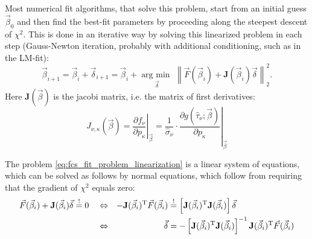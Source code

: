 \documentclass[a4paper,notitlepage]{article}
\DeclareMathOperator*{\argmin}{arg\:min\ }
\newcommand{\mat}[1]{\mathrm{\mathbf{#1}}}
\begin{document}
Most numerical fit algorithms, that solve this problem, start from an initial guess $\vec{\beta}_0$ and then find the best-fit parameters by proceeding along the steepest descent of $\chi^2$. This is done in an iterative way by solving this linearized problem in each step (Gauss-Newton iteration, probably with additional conditioning, such as in the LM-fit):
\begin{equation}\label{eq:fcs_fit_problem_linearization}
  \vec{\beta}_{i+1}=\vec{\beta}_{i}+\vec{\delta}_{i+1}=\vec{\beta}_{i}+\argmin\limits_{\vec{\delta}}\left\|\vec{F}(\vec{\beta}_i)+\mat{J}(\vec{\beta}_i)\vec{\delta}\right\|_2^2.
\end{equation}
Here $\mat{J}(\vec{\beta})$ is the jacobi matrix, i.e. the matrix of first derivatives:
\begin{equation}\label{eq:fit_jacobi}
    J_{\nu,\kappa}(\vec{\beta})=\left.\frac{\partial f_\nu}{\partial p_\kappa}\right|_{\vec{\beta}}=\frac{1}{\hat{\sigma}_\nu}\cdot\left.\frac{\partial g(\hat{\tau}_\nu;\vec{\beta})}{\partial p_\kappa}\right|_{\vec{\beta}}
\end{equation}

The problem \eqref{eq:fcs_fit_problem_linearization} is a linear system of equations, which can be solved as follows by normal equations, which follow from requiring that the gradient of $\chi^2$ equals zero:
\begin{align}
  \vec{F}(\vec{\beta}_i)+\mat{J}(\vec{\beta}_i)\vec{\delta}&\overset{!}{=}0&&\Leftrightarrow&-\mat{J}(\vec{\beta}_i)^\mathrm{T}\vec{F}(\vec{\beta}_i)&\overset{!}{=}\left[\mat{J}(\vec{\beta}_i)^\mathrm{T}\mat{J}(\vec{\beta}_i)\right]\vec{\delta}\notag\\
  &&&\Leftrightarrow&\vec{\delta}&=-\left[\mat{J}(\vec{\beta}_i)^\mathrm{T}\mat{J}(\vec{\beta}_i)\right]^{-1}\mat{J}(\vec{\beta}_i)^\mathrm{T}\vec{F}(\vec{\beta}_i)\label{eq:fcs_fit_problem_linearization_solution}
\end{align}
\end{document}
